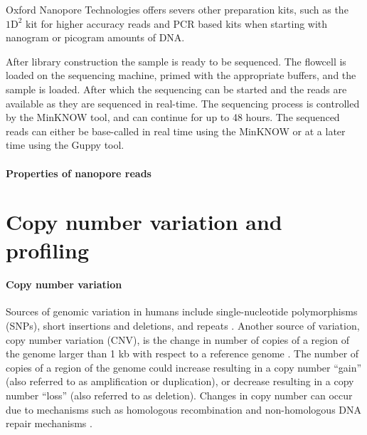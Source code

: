 Oxford Nanopore Technologies offers severs other preparation kits, such
as the $\text{1D}^2$ kit for higher accuracy reads and PCR based kits when
starting with nanogram or picogram amounts of DNA.

After library construction the sample is ready to be sequenced. The
flowcell is loaded on the sequencing machine, primed with the appropriate
buffers, and the sample is loaded. After which the sequencing can be
started and the reads are available as they are sequenced in real-time.
%
The sequencing process is controlled by the MinKNOW tool, and can
continue for up to 48 hours.
The sequenced reads can either be base-called in real time using the
MinKNOW or at a later time using the Guppy tool.

\paragraph{Properties of nanopore reads}



\section{Copy number variation and profiling}
\paragraph{Copy number variation}
Sources of genomic variation in humans include
single-nucleotide polymorphisms (SNPs), short insertions and deletions, and
repeats \citep{}.
Another source of variation, copy number variation (CNV), is the change in
number of copies of a region of the genome larger than 1 kb with
respect to a reference genome
\citep{redon2006global,feuk2006structural}.  The number of copies of a
region of the genome could increase resulting in a copy number ``gain''
(also referred to as amplification or duplication), or decrease resulting in a
copy number ``loss'' (also referred to as deletion).
Changes in copy number can occur due to mechanisms such as homologous
recombination and non-homologous DNA repair mechanisms
\citep{hastings2009mechanisms,van2011origins}.

